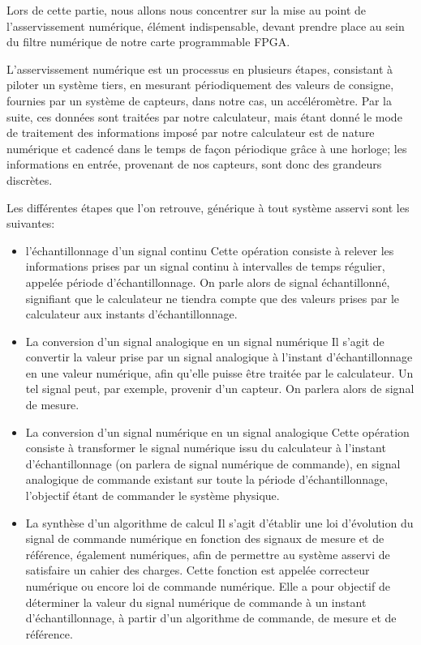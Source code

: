 \documentclass[french,a4paper,12pt]{report}
\begin{document}
	Lors de cette partie, nous allons nous concentrer sur la mise au point de l'asservissement numérique, élément indispensable, devant prendre place au sein du filtre numérique de notre carte programmable FPGA.
	
	L'asservissement numérique est un processus en plusieurs étapes, consistant à piloter un système tiers, en mesurant périodiquement des valeurs de consigne, fournies par un système de capteurs, dans notre cas, un accéléromètre. 
	Par la suite, ces données sont traitées par notre calculateur, mais étant donné le mode de traitement des informations imposé par notre calculateur est de nature numérique et cadencé dans le temps de façon périodique grâce à une horloge; les informations en entrée, provenant de nos capteurs, sont donc des grandeurs discrètes.
	
	Les différentes étapes que l'on retrouve,  générique à tout système asservi sont les suivantes:
	
	\begin{itemize}
		\item l'échantillonnage d'un signal continu
			Cette opération consiste à relever les informations prises par un signal continu à intervalles de temps
			régulier, appelée période d'échantillonnage. On parle alors de signal échantillonné, signifiant que le
			calculateur ne tiendra compte que des valeurs prises par le calculateur aux instants d'échantillonnage.
			
		\item La conversion d'un signal analogique en un signal numérique
			Il s'agit de convertir la valeur prise par un signal analogique à l'instant d'échantillonnage en une
			valeur numérique, afin qu'elle puisse être traitée par le calculateur. Un tel signal peut, par exemple, 
			provenir d'un capteur. On parlera alors de signal de mesure.
			 
		\item La conversion d'un signal numérique en un signal analogique
			Cette opération consiste à transformer le signal numérique issu du calculateur à l'instant 
			d'échantillonnage (on parlera de signal numérique de commande), en signal analogique de commande 
			existant sur toute la période d'échantillonnage, l'objectif étant de commander le système physique.
			
		\item  La synthèse d'un algorithme de calcul
			Il s'agit d'établir une loi d'évolution du signal de commande numérique en fonction des signaux de mesure
			et de référence, également numériques, afin de permettre au système asservi de satisfaire un cahier des
			charges. Cette fonction est appelée correcteur numérique ou encore loi de commande numérique. Elle a pour
			objectif de déterminer la valeur du signal numérique de commande à un instant d'échantillonnage, à partir 
			d'un algorithme de commande, de mesure et de référence.
	\end{itemize}
	
\end{document}
